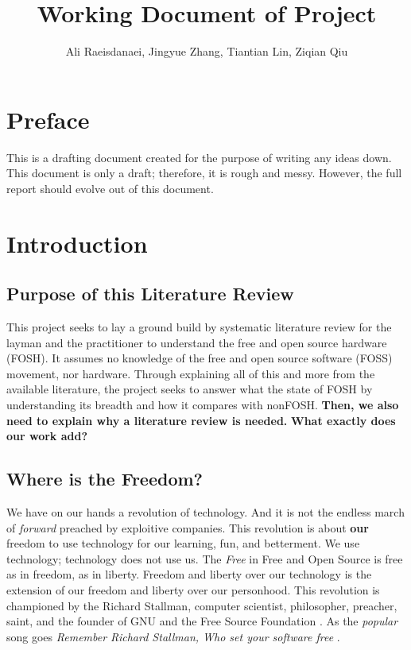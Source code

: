 \documentclass{article}
\begin{document}


\title{Working Document of Project}
\author{Ali Raeisdanaei, Jingyue Zhang, Tiantian Lin, Ziqian Qiu }
\date{}
\maketitle

\section{Preface}
This is a drafting document created for the purpose of writing any ideas down.
This document is only a draft; therefore, it is rough and messy.
However, the full report should evolve out of this document.


\section{Introduction}

\subsection{Purpose of this Literature Review}
This project seeks to lay a ground build by systematic literature review for the layman and the practitioner to understand the free and open source hardware (FOSH).
It assumes no knowledge of the free and open source software (FOSS) movement, nor hardware.
Through explaining all of this and more from the available literature, the project seeks to answer what the state of FOSH by understanding its breadth and how it compares with nonFOSH.
\textbf{Then, we also need to explain why a literature review is needed.}
\textbf{What exactly does our work add?}

\subsection{Where is the Freedom?}
We have on our hands a revolution of technology. 
And it is not the endless march of \textit{forward} preached by exploitive companies.
This revolution is about \textbf{our} freedom to use technology for our learning, fun, and betterment.
We use technology; technology does not use us. 
The \textit{Free} in Free and Open Source is free as in freedom, as in liberty.
Freedom and liberty over our technology is the extension of our freedom and liberty over our personhood.
This revolution is championed by the Richard Stallman, computer scientist, philosopher, preacher, saint, and the founder of GNU and the Free Source Foundation \cite{b0_stallman}.
As the \textit{popular} song goes \textit{Remember Richard Stallman,
Who set your software free} \cite{song_GNUs_Not_Unix}.
\end{document}
